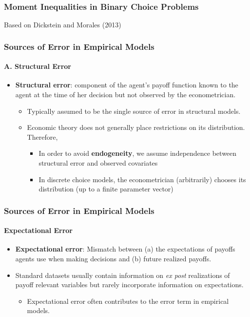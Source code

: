 \begin{frame}
\frametitle{Moment Inequalities in Binary Choice Problems}

Based on Dickstein and Morales (2013)

\end{frame}

\begin{frame}
\frametitle{Sources of Error in Empirical Models}
\framesubtitle{A. Structural Error}

\begin{itemize}
	\item \textbf{Structural error}: component of the agent's payoff function known to the agent at the time of her decision but not observed by the econometrician.	
	\pause
	\begin{itemize}
	\item Typically assumed to be the single source of error in structural models.
	\item Economic theory does not generally place restrictions on its distribution. Therefore,
	\pause
	\begin{itemize}
		\item In order to avoid \textbf{endogeneity}, we assume independence between structural error and observed covariates
		\item In discrete choice models, the econometrician (arbitrarily) chooses its distribution (up to a finite parameter vector)
	\end{itemize}
\end{itemize}
\end{itemize}
\end{frame}
\begin{frame}
\frametitle{Sources of Error in Empirical Models}
\framesubtitle{Expectational Error}

\begin{itemize}
	\item \textbf{Expectational error}: Mismatch between (a) the expectations of payoffs agents use when making decisions and (b) future realized payoffs.
	\item Standard datasets usually contain information on \textit{ex post} realizations of payoff relevant variables but rarely incorporate information on expectations.
	\begin{itemize}
		\item Expectational error often contributes to the error term in empirical models.
	\end{itemize}
\end{itemize}
\end{frame}

